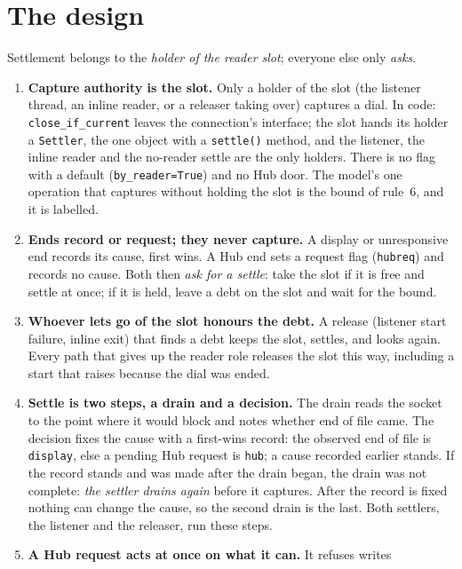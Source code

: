 \documentclass[a4paper,10pt,fleqn]{article}
\begin{document}
\section{The design}

Settlement belongs to the \emph{holder of the reader slot}; everyone else only
\emph{asks}.

\begin{enumerate}
  \item \textbf{Capture authority is the slot.}  Only a holder of the slot
    (the listener thread, an inline reader, or a releaser taking over) captures a
    dial.  In code: \texttt{close\_if\_current} leaves the connection's
    interface; the slot hands its holder a \texttt{Settler}, the one object with
    a \texttt{settle()} method, and the listener, the inline reader and the
    no-reader settle are the only holders.  There is no flag with a default
    (\texttt{by\_reader=True}) and no Hub door.  The model's one operation that
    captures without holding the slot is the bound of rule~6, and it is
    labelled.
  \item \textbf{Ends record or request; they never capture.}  A display or
    unresponsive end records its cause, first wins.  A Hub end sets a request
    flag (\texttt{hubreq}) and records no cause.  Both then \emph{ask for a
    settle}: take the slot if it is free and settle at once; if it is held, leave
    a debt on the slot and wait for the bound.
  \item \textbf{Whoever lets go of the slot honours the debt.}  A release
    (listener start failure, inline exit) that finds a debt keeps the slot,
    settles, and looks again.  Every path that gives up the reader role releases
    the slot this way, including a start that raises because the dial was ended.
  \item \textbf{Settle is two steps, a drain and a decision.}  The drain reads
    the socket to the point where it would block and notes whether end of file
    came.  The decision fixes the cause with a first-wins record: the observed
    end of file is \texttt{display}, else a pending Hub request is \texttt{hub};
    a cause recorded earlier stands.  If the record stands and was made after the
    drain began, the drain was not complete: \emph{the settler drains again}
    before it captures.  After the record is fixed nothing can change the cause,
    so the second drain is the last.  Both settlers, the listener and the
    releaser, run these steps.
  \item \textbf{A Hub request acts at once on what it can.}  It refuses writes

\end{enumerate}
\end{document}
